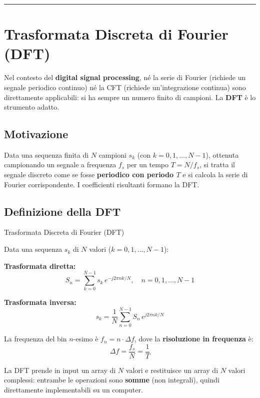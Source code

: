 \documentclass[
  italian,
  openany]{book}
\begin{document}
\begin{center}\rule{0.5\linewidth}{0.5pt}\end{center}

\section{Trasformata Discreta di Fourier
(DFT)}\label{trasformata-discreta-di-fourier-dft}

Nel contesto del \textbf{digital signal processing}, né la serie di
Fourier (richiede un segnale periodico continuo) né la CFT (richiede
un'integrazione continua) sono direttamente applicabili: si ha sempre un
numero finito di campioni. La \textbf{DFT} è lo strumento adatto.

\subsection{Motivazione}\label{motivazione}

Data una sequenza finita di \(N\) campioni \(s_k\) (con
\(k = 0, 1, \ldots, N-1\)), ottenuta campionando un segnale a frequenza
\(f_s\) per un tempo \(T = N/f_s\), si tratta il segnale discreto come
se fosse \textbf{periodico con periodo \(T\)} e si calcola la serie di
Fourier corrispondente. I coefficienti risultanti formano la DFT.

\subsection{Definizione della DFT}\label{definizione-della-dft}

\begin{calloutdefinition}{Trasformata Discreta di Fourier (DFT)}

Data una sequenza \(s_k\) di \(N\) valori (\(k = 0, 1, \ldots, N-1\)):

\textbf{Trasformata diretta:}
\[S_n = \sum_{k=0}^{N-1} s_k \, e^{-j2\pi nk/N}, \quad n = 0, 1, \ldots, N-1\]

\textbf{Trasformata inversa:}
\[s_k = \frac{1}{N} \sum_{n=0}^{N-1} S_n \, e^{j2\pi nk/N}\]

La frequenza del bin \(n\)-esimo è \(f_n = n \cdot \Delta f\), dove la
\textbf{risoluzione in frequenza} è:
\[\Delta f = \frac{f_s}{N} = \frac{1}{T}\]

\end{calloutdefinition}

La DFT prende in input un array di \(N\) valori e restituisce un array
di \(N\) valori complessi: entrambe le operazioni sono \textbf{somme}
(non integrali), quindi direttamente implementabili su un computer.
\end{document}
